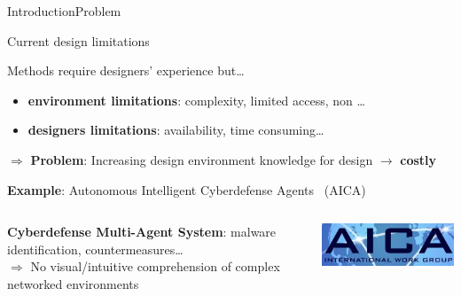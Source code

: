 \begin{frame}{Introduction}{Problem}


    \begin{alertblock}{Current design limitations}

        Methods require designers' experience but\dots
        \begin{itemize}
            \item \textbf{environment limitations}: complexity, limited access, non \dots
            \item \textbf{designers limitations}: availability, time consuming\dots
        \end{itemize}

        \vspace{-2ex}

        \begin{center}
            \begin{minipage}{11cm}
                \begin{block}{}
                    $\Longrightarrow$ \textbf{Problem}: Increasing design environment knowledge for design $\rightarrow$ \textbf{costly}
                \end{block}
            \end{minipage}
        \end{center}

        \vspace{-2ex}
        \begin{center}
            \begin{minipage}{0.95\linewidth}
                \centering
                \begin{exampleblock}{\textbf{Example}: Autonomous Intelligent Cyberdefense Agents~\cite{Kott2023} (AICA)}

                    \begin{columns}
                        \hspace{5ex}
                        \begin{column}{0.85\textwidth}
                            \textbf{Cyberdefense Multi-Agent System}: malware identification, countermeasures\dots \\
                            $\Longrightarrow$ No visual/intuitive comprehension of complex networked environments
                        \end{column}
                        \begin{column}{0.22\textwidth}
                            \hspace{-2.5ex}
                            \includegraphics[width=0.8\linewidth]{figures/AICA_IWG.jpg}
                        \end{column}
                    \end{columns}


\end{exampleblock}
\end{minipage}
\end{center}
\end{alertblock}
\end{frame}
